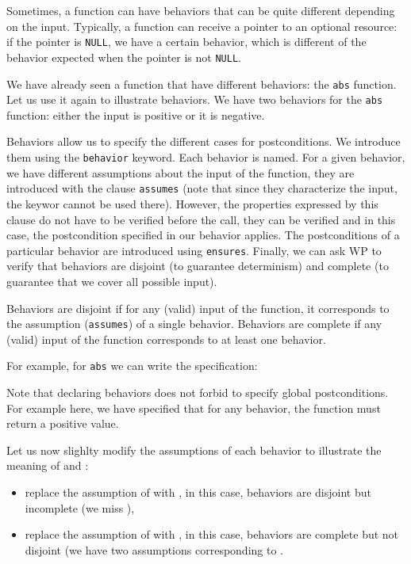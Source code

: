 Sometimes, a function can have behaviors that can be quite different
depending on the input. Typically, a function can receive a pointer to
an optional resource: if the pointer is \texttt{NULL}, we have a
certain behavior, which is different of the behavior expected when
the pointer is not \texttt{NULL}.

We have already seen a function that have different behaviors: the
\texttt{abs} function. Let us use it again to illustrate behaviors. We
have two behaviors for the \texttt{abs} function: either the input is
positive or it is negative.

Behaviors allow us to specify the different cases for postconditions. We
introduce them using the \texttt{behavior} keyword. Each behavior 
is named. For a given behavior, we have different assumptions about the
input of the function, they are introduced with the clause
\texttt{assumes} (note that since they characterize the input, the
keywor  cannot be used there). However,
the properties expressed by this clause do not have to be verified before
the call, they can be verified and in this case, the postcondition
specified in our behavior applies. The postconditions of a particular
behavior are introduced using \texttt{ensures}. Finally, we can ask WP to
verify that behaviors are disjoint (to guarantee determinism) and
complete (to guarantee that we cover all possible input).

Behaviors are disjoint if for any (valid) input of the function, it
corresponds to the assumption (\texttt{assumes}) of a single behavior.
Behaviors are complete if any (valid) input of the function corresponds
to at least one behavior.

For example, for \texttt{abs} we can write the specification:






Note that declaring behaviors does not forbid to specify global postconditions.
For example here, we have specified that for any behavior, the function must
return a positive value.



Let us now slighlty modify the assumptions of each behavior to illustrate
the meaning of  and :

\begin{itemize}
\item
  replace the assumption of  with
  , in this case, behaviors are
  disjoint but incomplete (we miss ),
\item
  replace the assumption of  with
  , in this case, behaviors are
  complete but not disjoint (we have two assumptions corresponding
  to .
\end{itemize}


